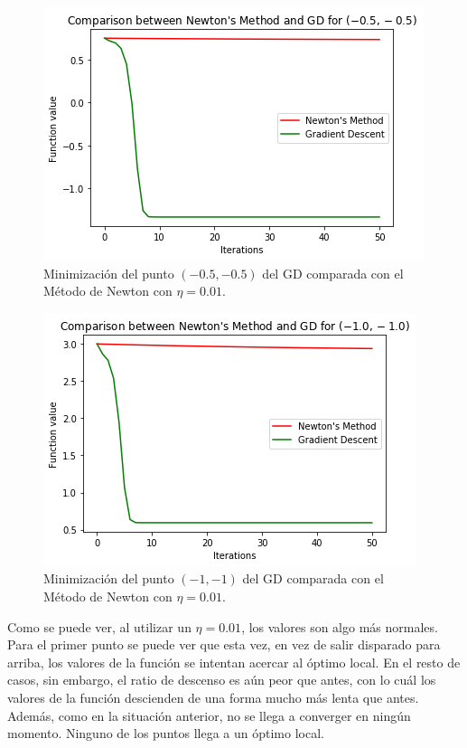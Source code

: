 \documentclass[11pt,a4paper]{article}
\begin{document}
\begin{figure}[H]
\centering
\includegraphics[scale=0.8]{img/nm_lr_cmp3.png}
\caption{Minimización del punto $(-0.5, -0.5)$ del GD comparada con el Método de Newton con $\eta = 0.01$.}
\end{figure}

\begin{figure}[H]
\centering
\includegraphics[scale=0.8]{img/nm_lr_cmp4.png}
\caption{Minimización del punto $(-1, -1)$ del GD comparada con el Método de Newton con $\eta = 0.01$.}
\end{figure}

Como se puede ver, al utilizar un $\eta = 0.01$, los valores son algo más normales. Para el primer punto se puede ver que
esta vez, en vez de salir disparado para arriba, los valores de la función se intentan acercar al óptimo local. En el resto
de casos, sin embargo, el ratio de descenso es aún peor que antes, con lo cuál los valores de la función descienden de una
forma mucho más lenta que antes. Además, como en la situación anterior, no se llega a converger en ningún momento. Ninguno
de los puntos llega a un óptimo local.\\
\end{document}
